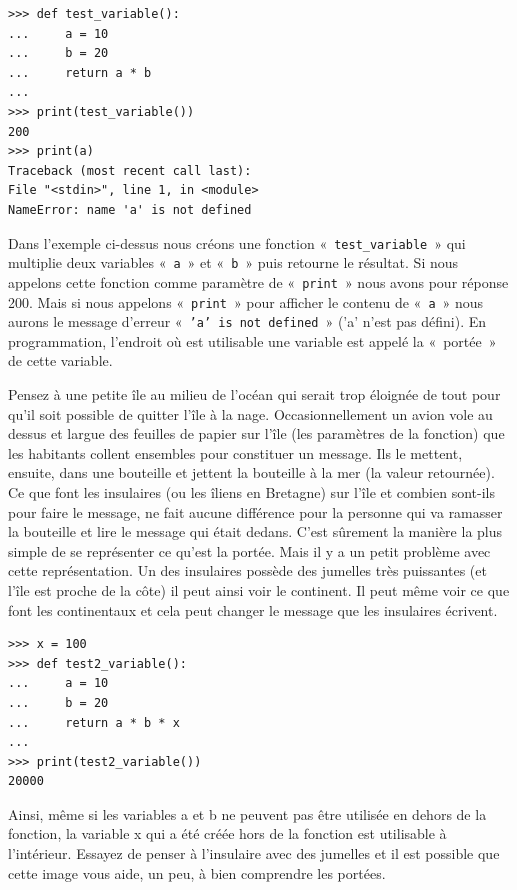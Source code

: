 \begin{Verbatim}[frame=single,rulecolor=\color{red}, label=erreur]
>>> def test_variable():
...     a = 10
...     b = 20
...     return a * b
...
>>> print(test_variable())
200
>>> print(a)
Traceback (most recent call last):
File "<stdin>", line 1, in <module>
NameError: name 'a' is not defined
\end{Verbatim}

Dans l'exemple ci-dessus nous créons une fonction « \texttt{test\_variable} » qui multiplie deux variables « \texttt{a} » et « \texttt{b} » puis retourne le résultat. Si nous appelons cette fonction comme paramètre de « \texttt{print} »  nous avons pour réponse 200. Mais si nous appelons « \texttt{print} » pour afficher le contenu de « \texttt{a} » nous aurons  le message d'erreur « \texttt{'a' is not defined} » ('a' n'est pas défini). En programmation, l'endroit où est utilisable une variable est appelé la « portée » de cette variable.

Pensez à une petite île au milieu de l'océan qui serait trop éloignée de tout pour qu'il soit possible de quitter l'île à la nage. Occasionnellement un avion vole au dessus et largue des feuilles de papier sur l'île (les paramètres de la fonction) que les habitants collent ensembles pour constituer un message. Ils le mettent, ensuite, dans une bouteille et jettent la bouteille à la mer (la valeur retournée). Ce que font les insulaires (ou les îliens en Bretagne) sur l'île et combien sont-ils pour faire le message, ne fait aucune différence pour la personne qui va ramasser la bouteille et lire le message qui était dedans. C'est sûrement la manière la plus simple de se représenter ce qu'est la portée. Mais il y a un petit problème avec cette représentation. Un des insulaires possède des jumelles très puissantes (et l'île est proche de la côte) il peut ainsi voir le continent. Il peut même voir ce que font les continentaux et cela peut changer le message que les insulaires écrivent.

 \begin{Verbatim}[frame=single,rulecolor=\color{mbleu}, label=à taper]
>>> x = 100
>>> def test2_variable():
...     a = 10
...     b = 20
...     return a * b * x
...
>>> print(test2_variable())
20000
\end{Verbatim}

Ainsi, même si les variables a et b ne peuvent pas être utilisée en dehors de la fonction, la variable x qui a été créée hors de la fonction est utilisable à l'intérieur. Essayez de penser à l'insulaire avec des jumelles et il est possible que cette image vous aide, un peu, à bien comprendre les portées. 

